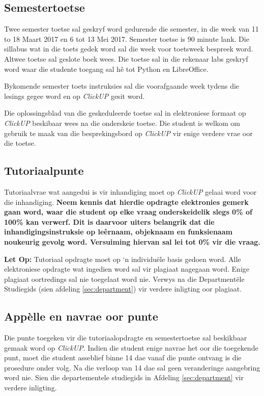     \subsection{Semestertoetse}
        Twee semester toetse sal geskryf word gedurende die semester, in die
        week van 11 to 18 Maart 2017 en 6 tot 13 Mei 2017. Semester
        toetse is 90 minute lank. Die sillabus wat in die toets gedek word sal
        die week voor toetsweek bespreek word. Altwee toetse sal geslote boek
        wees. Die toetse sal in die rekenaar labs geskryf word waar die
        studente toegang sal h\^{e} tot Python en LibreOffice.

        Bykomende semester toets instruksies sal die voorafgaande week tydens
        die lesings gegee word en op \textit{ClickUP} gesit word.

        Die oplossingsblad van die geskeduleerde toetse sal in elektroniese
        formaat op \textit{ClickUP} beskibaar wees na die onderskeie toetse.
        Die student is welkom om gebruik te maak van die besprekingsbord op
        \textit{ClickUP} vir enige verdere vrae oor die toetse.

    \subsection{Tutoriaalpunte} \label{sec:tutoriaal}
        Tutoriaalvrae wat aangedui is vir inhandiging moet op \textit{ClickUP}
        gelaai word voor die inhandiging. \textbf{Neem kennis dat hierdie
        opdragte elektronies gemerk gaan word, waar die student op elke
        vraag onderskeidelik slegs 0\% of 100\% kan verwerf. Dit is
        daarvoor uiters belangrik dat die inhandigingsinstruksie op
        le\^ernaam, objeknaam en funksienaam noukeurig gevolg word.
        Versuiming hiervan sal lei tot 0\% vir die vraag.}

        \textbf{Let Op:} Tutoriaal opdragte moet op `n individu\"ele basis
        gedoen word. Alle elektroniese opdragte wat ingedien word sal vir
        plagiaat nagegaan word. Enige plagiaat oortredings sal nie toegelaat
        word nie.  Verwys na die Department\"ele Studiegids (sien afdeling
        \ref{sec:department}) vir verdere inligting oor plagiaat.

    \subsection{App\`{e}lle en navrae oor punte}
        Die punte toegeken vir die tutoriaalopdragte en semestertoetse sal
        beskikbaar gemaak word op \textit{ClickUP}. Indien die student enige
        navrae het oor die toegekende punt, moet die student asseblief binne 14
        dae vanaf die punte ontvang is die prosedure onder volg.  Na die
        verloop van 14 dae sal geen veranderinge aangebring word nie. Sien die
        departementele studiegids in Afdeling \ref{sec:department} vir verdere
        inligting.

